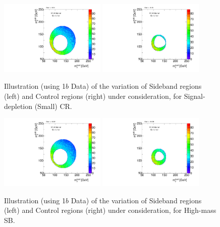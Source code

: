 \begin{figure}[htbp!]
\begin{center}
\includegraphics[angle=270, width=0.45\textwidth]{./figures/boosted/Syst_CRSB/CR_Small_Sideband_OneTag_mH0H1.pdf}
\includegraphics[angle=270, width=0.45\textwidth]{./figures/boosted/Syst_CRSB/CR_Small_Control_OneTag_mH0H1.pdf}\\
\end{center}
\caption{Illustration (using 1$b$ Data) of the variation of Sideband regions (left) and Control regions (right) under consideration, for Signal-depletion (Small) CR.}
\label{CRSB:CR_Small}
\end{figure}

\begin{figure}[htbp!]
\begin{center}
\includegraphics[angle=270, width=0.45\textwidth]{./figures/boosted/Syst_CRSB/SB_High_Sideband_OneTag_mH0H1.pdf}
\includegraphics[angle=270, width=0.45\textwidth]{./figures/boosted/Syst_CRSB/SB_High_Control_OneTag_mH0H1.pdf}\\
\end{center}
\caption{Illustration (using 1$b$ Data) of the variation of Sideband regions (left) and Control regions (right) under consideration, for High-mass SB.}
\label{CRSB:SB_High}
\end{figure}


